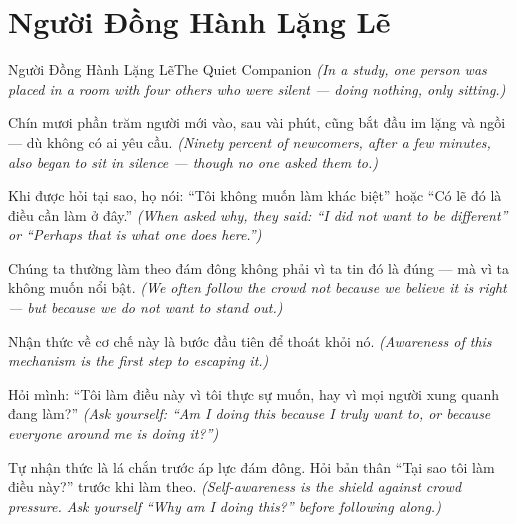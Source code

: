\section{Người Đồng Hành Lặng Lẽ}
\begin{truyen}{Người Đồng Hành Lặng Lẽ}{The Quiet Companion}
\textit{(In a study, one person was placed in a room with four others who were silent — doing nothing, only sitting.)}

Chín mươi phần trăm người mới vào, sau vài phút, cũng bắt đầu im lặng và ngồi — dù không có ai yêu cầu.
\textit{(Ninety percent of newcomers, after a few minutes, also began to sit in silence — though no one asked them to.)}

Khi được hỏi tại sao, họ nói: ``Tôi không muốn làm khác biệt'' hoặc ``Có lẽ đó là điều cần làm ở đây.''
\textit{(When asked why, they said: ``I did not want to be different'' or ``Perhaps that is what one does here.'')}

Chúng ta thường làm theo đám đông không phải vì ta tin đó là đúng — mà vì ta không muốn nổi bật.
\textit{(We often follow the crowd not because we believe it is right — but because we do not want to stand out.)}

Nhận thức về cơ chế này là bước đầu tiên để thoát khỏi nó.
\textit{(Awareness of this mechanism is the first step to escaping it.)}

Hỏi mình: ``Tôi làm điều này vì tôi thực sự muốn, hay vì mọi người xung quanh đang làm?''
\textit{(Ask yourself: ``Am I doing this because I truly want to, or because everyone around me is doing it?'')}

\end{truyen}

\begin{baihoc}
Tự nhận thức là lá chắn trước áp lực đám đông. Hỏi bản thân ``Tại sao tôi làm điều này?'' trước khi làm theo.
\textit{(Self-awareness is the shield against crowd pressure. Ask yourself ``Why am I doing this?'' before following along.)}
\end{baihoc}
\ngancach

